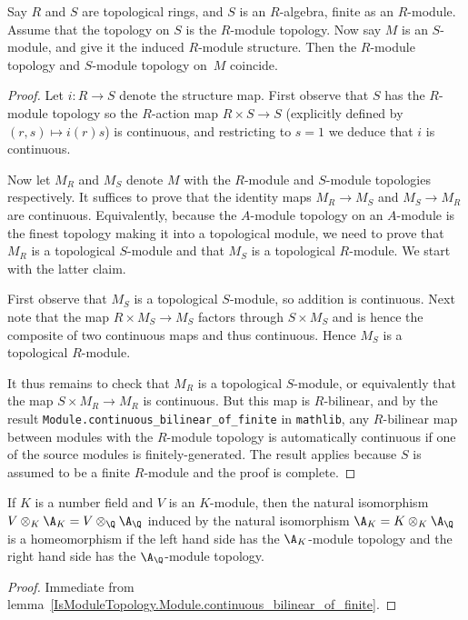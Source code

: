 \begin{lemma}
  \label{IsModuleTopology.Module.continuous_bilinear_of_finite}
  \leanok
  Say $R$ and $S$ are topological rings, and $S$ is an $R$-algebra, finite as an $R$-module.
  Assume that the topology
  on $S$ is the $R$-module topology. Now say $M$ is an $S$-module, and give it the induced
  $R$-module structure. Then the $R$-module topology and $S$-module topology on~$M$ coincide.
\end{lemma}
\begin{proof}
  \leanok
  Let $i:R\to S$ denote the structure map. First observe that $S$ has the $R$-module topology
  so the $R$-action map $R\times S\to S$ (explicitly defined by $(r,s)\mapsto i(r)s$)
  is continuous, and restricting to $s=1$ we deduce that $i$ is continuous.

  Now let $M_R$ and $M_S$ denote $M$ with the $R$-module and $S$-module topologies respectively.
  It suffices to prove that the identity maps $M_R\to M_S$ and $M_S\to M_R$ are continuous.
  Equivalently, because the $A$-module topology on an $A$-module is the finest topology
  making it into a topological module, we need to prove that $M_R$ is a topological $S$-module
  and that $M_S$ is a topological $R$-module. We start with the latter claim.

  First observe that $M_S$ is a topological $S$-module, so addition is continuous.
  Next note that the map $R\times M_S\to M_S$ factors through $S\times M_S$ and is hence the
  composite of two continuous maps and thus continuous. Hence $M_S$ is a topological $R$-module.

  It thus remains to check that $M_R$ is a topological $S$-module, or equivalently
  that the map $S\times M_R\to M_R$ is continuous. But this map is $R$-bilinear, and
  by the result {\tt Module.continuous\_bilinear\_of\_finite} in {\tt mathlib}, any
  $R$-bilinear map between modules with the $R$-module topology is automatically continuous
  if one of the source modules is finitely-generated. The result applies because $S$ is
  assumed to be a finite $R$-module and the proof is complete.
\end{proof}

\begin{corollary}
  \label{NumberField.AdeleRing.ModuleBaseChangeContinuousAddEquiv}
  If $K$ is a number field and $V$ is an $K$-module, then
  the natural isomorphism $V\otimes_K\A_K=V\otimes_{\Q}\A_{\Q}$ induced by the natural
  isomorphism $\A_K=K\otimes_K\A_{\Q}$ is a homeomorphism if the left hand side has the $\A_K$-module
  topology and the right hand side has the $\A_{\Q}$-module topology.
\end{corollary}
\begin{proof}
  Immediate from lemma~\ref{IsModuleTopology.Module.continuous_bilinear_of_finite}.
\end{proof}


